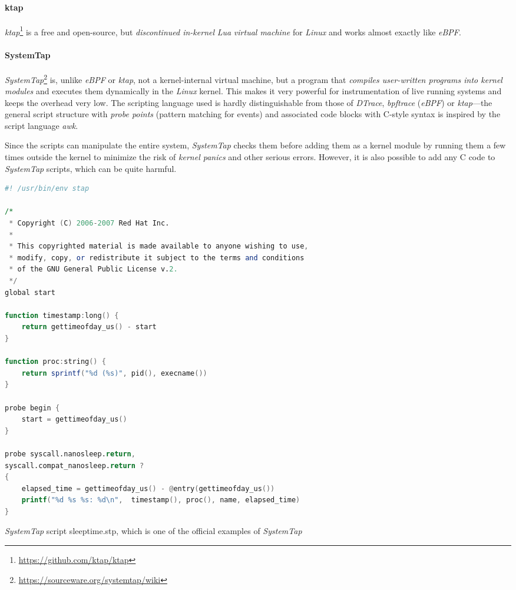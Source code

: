 \paragraph{ktap}

    \textit{ktap}\footnote{\url{https://github.com/ktap/ktap}} is a free and open-source, but \emph{discontinued in-kernel} \textit{Lua} \emph{virtual machine} for \textit{Linux} and works almost exactly like \textit{eBPF}.

\paragraph{SystemTap}

    \textit{SystemTap}\footnote{\url{https://sourceware.org/systemtap/wiki}} is, unlike \textit{eBPF} or \textit{ktap}, not a kernel-internal virtual machine, but a program that \emph{compiles user-written programs into kernel modules} and executes them dynamically in the \textit{Linux} kernel. This makes it very powerful for instrumentation of live running systems and keeps the overhead very low. The scripting language used is hardly distinguishable from those of \textit{DTrace}, \textit{bpftrace} (\textit{eBPF}) or \textit{ktap}---the general script structure with \emph{probe points} (pattern matching for events) and associated code blocks with C-style syntax is inspired by the script language \textit{awk}.

    Since the scripts can manipulate the entire system, \textit{SystemTap} checks them before adding them as a kernel module by running them a few times outside the kernel to minimize the risk of \emph{kernel panics} and other serious errors. However, it is also possible to add any C code to \textit{SystemTap} scripts, which can be quite harmful.

\begin{@empty}
    \begin{code}[t!]
        \begin{lstlisting}[language = awk]
#! /usr/bin/env stap

/*
 * Copyright (C) 2006-2007 Red Hat Inc.
 * 
 * This copyrighted material is made available to anyone wishing to use,
 * modify, copy, or redistribute it subject to the terms and conditions
 * of the GNU General Public License v.2.
 */
global start

function timestamp:long() {
    return gettimeofday_us() - start
}

function proc:string() {
    return sprintf("%d (%s)", pid(), execname())
}

probe begin {
    start = gettimeofday_us()
}

probe syscall.nanosleep.return,
syscall.compat_nanosleep.return ?
{
    elapsed_time = gettimeofday_us() - @entry(gettimeofday_us())
    printf("%d %s %s: %d\n",  timestamp(), proc(), name, elapsed_time)
}
        \end{lstlisting}
        \caption[SystemTap script example]{\textit{SystemTap} script sleeptime.stp, which is one of the official examples of \textit{SystemTap}}
        \label{lst:systemtap}
    \end{code}
\end{@empty}

